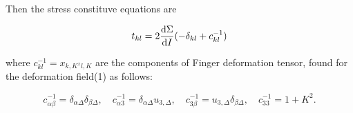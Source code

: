 \documentclass[8pt,a4paper]{article}
\begin{document}
Then the stress constituve equations are

\begin{center}
    \begin{equation}
        \displaystyle t_{kl}=2\diff[1]\Sigma I (-\delta_{kl}+c_{kl}^{-1})
    \end{equation}
\end{center}

where $c_{kl}^{-1}=x_{k,K^{x}l,K}$ are the components of Finger deformation tensor, found for the deformation field(1) as follows:

\begin{center}
    \begin{equation}
        \displaystyle c_{\alpha\beta}^{-1}=\delta_{\alpha\Delta}\delta_{\beta\Delta},\quad c_{\alpha3}^{-1}=\delta_{\alpha\Delta}u_{3,\Delta},\quad c_{3\beta}^{-1}=u_{3,\Delta}\delta_{\beta\Delta},\quad c_{33}^{-1}=1+K^2.
    \end{equation}
\end{center}

\newpage


\end{document}
